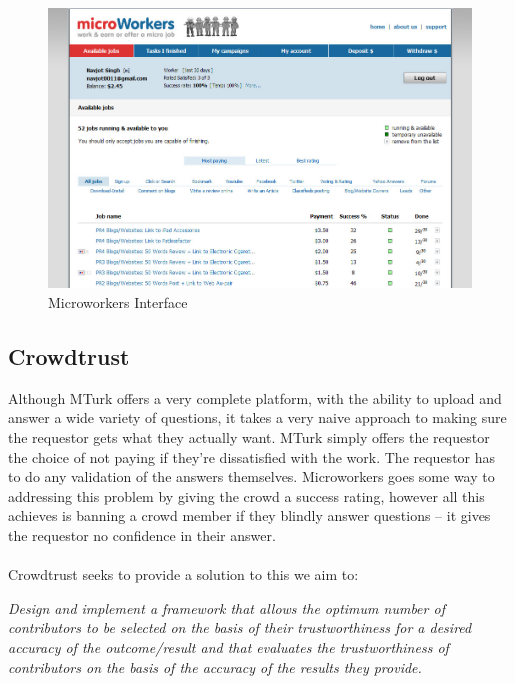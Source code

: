 \documentclass[11pt]{article}
\begin{document}
\begin{figure}[H]
\begin{center}
\includegraphics[width=\linewidth]{images/microworkersinterface.jpg}
\caption{Microworkers Interface}
\label{default}
\end{center}
\end{figure}


\subsection{Crowdtrust}
Although MTurk offers a very complete platform, with the ability to upload and answer a wide variety of questions,
it takes a very naive approach to making sure the requestor gets what they actually want. MTurk simply offers the requestor
the choice of not paying if they're dissatisfied with the work. The requestor has to do any validation of the answers themselves. 
Microworkers goes some way to addressing this problem by giving the crowd a success rating, however all this achieves is banning a crowd
member if they blindly answer questions -- it gives the requestor no confidence in their answer.
\\
\\
Crowdtrust seeks to provide a solution to this we aim to:

\emph{Design and implement a framework that allows the optimum number of contributors to be selected on the basis of their trustworthiness 
for a desired accuracy of the outcome/result and that evaluates the trustworthiness of contributors on the basis of the accuracy of the 
results they provide.}
\end{document}
